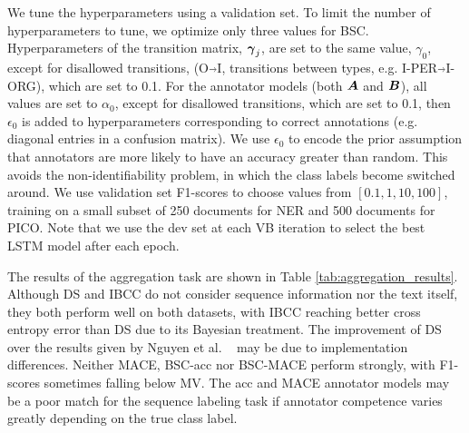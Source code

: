 We tune the hyperparameters using a validation set. To limit the number of hyperparameters to tune, we optimize only three values for BSC.
Hyperparameters of the transition matrix, $\boldsymbol\gamma_j$, are set to the same value, 
$\gamma_0$, except for disallowed transitions, (O$\Arrow{0.2cm}$I, transitions between types, e.g. I-PER$\Arrow{0.2cm}$I-ORG), which are set to 0.1.  
For the annotator models (both $\boldsymbol A$ and $\boldsymbol B$),
all values are set to $\alpha_0$, except for disallowed transitions, which are set to 0.1, then $\epsilon_0$ is added to hyperparameters 
corresponding to correct annotations (e.g. diagonal entries in a confusion matrix).
We use $\epsilon_0$ to encode the prior assumption that annotators are more likely to have an accuracy greater than random. This avoids the non-identifiability problem, in which the class labels become switched around.
We use validation set F1-scores to choose values from $[0.1, 1, 10, 100]$, 
training on a small subset of 250 documents for NER and 500 documents for PICO. 
Note that we use the dev set at each VB iteration to select the best
LSTM model after each epoch. 

The results of the aggregation task are shown in Table \ref{tab:aggregation_results}.
Although DS and IBCC do not consider sequence information nor the text itself, 
they both perform well on both datasets,
with IBCC reaching better cross entropy error than DS due to its Bayesian treatment.
The improvement of DS over the results given 
by Nguyen et al. ~ may be due to implementation differences. 
Neither MACE, BSC-acc nor BSC-MACE perform strongly, with F1-scores sometimes falling below MV. 
The acc and MACE annotator models may be a poor match for the sequence labeling task if annotator
competence varies greatly depending on the true class label.


